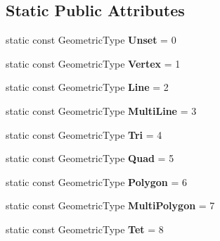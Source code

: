 \subsection*{Static Public Attributes}
\begin{DoxyCompactItemize}
\item 
\hypertarget{classINMOST_1_1Element_a5786982660a3e36c8737bfe21b82f97e}{static const Geometric\-Type {\bfseries Unset} = 0}\label{classINMOST_1_1Element_a5786982660a3e36c8737bfe21b82f97e}

\item 
\hypertarget{classINMOST_1_1Element_ad950b353be0244125d5357f129ba88b1}{static const Geometric\-Type {\bfseries Vertex} = 1}\label{classINMOST_1_1Element_ad950b353be0244125d5357f129ba88b1}

\item 
\hypertarget{classINMOST_1_1Element_aa72c7c2cc44eec2d75ba542d7decd69e}{static const Geometric\-Type {\bfseries Line} = 2}\label{classINMOST_1_1Element_aa72c7c2cc44eec2d75ba542d7decd69e}

\item 
\hypertarget{classINMOST_1_1Element_ad48b58c89bb22135c5a6df5e7bb5e17a}{static const Geometric\-Type {\bfseries Multi\-Line} = 3}\label{classINMOST_1_1Element_ad48b58c89bb22135c5a6df5e7bb5e17a}

\item 
\hypertarget{classINMOST_1_1Element_a59e88a5983029f92558294c29b7ca2d0}{static const Geometric\-Type {\bfseries Tri} = 4}\label{classINMOST_1_1Element_a59e88a5983029f92558294c29b7ca2d0}

\item 
\hypertarget{classINMOST_1_1Element_a051ce85c1ea896e08463c8598d69c705}{static const Geometric\-Type {\bfseries Quad} = 5}\label{classINMOST_1_1Element_a051ce85c1ea896e08463c8598d69c705}

\item 
\hypertarget{classINMOST_1_1Element_a95ee00f2fb07adb32080be429aea53fd}{static const Geometric\-Type {\bfseries Polygon} = 6}\label{classINMOST_1_1Element_a95ee00f2fb07adb32080be429aea53fd}

\item 
\hypertarget{classINMOST_1_1Element_a7f22e034805676dc0529248255ead16a}{static const Geometric\-Type {\bfseries Multi\-Polygon} = 7}\label{classINMOST_1_1Element_a7f22e034805676dc0529248255ead16a}

\item 
\hypertarget{classINMOST_1_1Element_a83f9fdad8c678146cb5e6cbf6aee94d1}{static const Geometric\-Type {\bfseries Tet} = 8}\label{classINMOST_1_1Element_a83f9fdad8c678146cb5e6cbf6aee94d1}


\end{DoxyCompactItemize}
